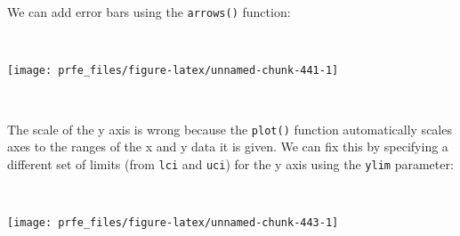 \documentclass[
  12pt,
  a4paper]{book}
\newenvironment{Shaded}{\begin{snugshade}}{\end{snugshade}}
\newcommand{\AttributeTok}[1]{\textcolor[rgb]{0.77,0.63,0.00}{#1}}
\newcommand{\DecValTok}[1]{\textcolor[rgb]{0.00,0.00,0.81}{#1}}
\newcommand{\FloatTok}[1]{\textcolor[rgb]{0.00,0.00,0.81}{#1}}
\newcommand{\FunctionTok}[1]{\textcolor[rgb]{0.00,0.00,0.00}{#1}}
\newcommand{\NormalTok}[1]{#1}
\newcommand{\SpecialCharTok}[1]{\textcolor[rgb]{0.00,0.00,0.00}{#1}}
\newcommand{\StringTok}[1]{\textcolor[rgb]{0.31,0.60,0.02}{#1}}
\begin{document}
\newpage

We can add error bars using the \texttt{arrows()} function:

~

\begin{Shaded}
\end{Shaded}

\begin{center}\texttt{[image: prfe\_files/figure-latex/unnamed-chunk-441-1]} \end{center}

~

The scale of the y axis is wrong because the \texttt{plot()} function automatically scales axes to the ranges of the x and y data it is given. We can fix this by specifying a different set of limits (from \texttt{lci} and \texttt{uci}) for the y axis using the \texttt{ylim} parameter:

~

\begin{Shaded}
\end{Shaded}

\newpage

\begin{center}\texttt{[image: prfe\_files/figure-latex/unnamed-chunk-443-1]} \end{center}
\end{document}
